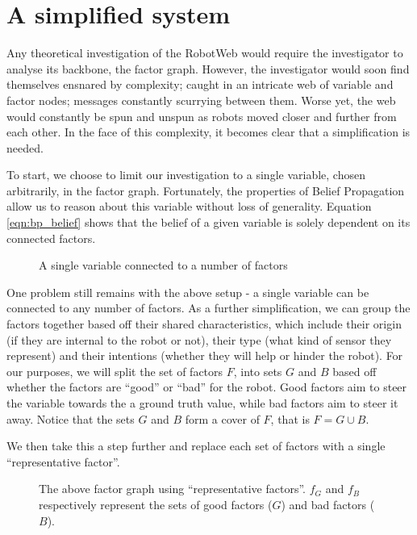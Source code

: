 \section{A simplified system}
Any theoretical investigation of the RobotWeb would require the investigator to analyse its backbone, the factor graph. However, the investigator would soon find themselves ensnared by complexity; caught in an intricate web of variable and factor nodes; messages constantly scurrying between them. Worse yet, the web would constantly be spun and unspun as robots moved closer and further from each other.
In the face of this complexity, it becomes clear that a simplification is needed.

To start, we choose to limit our investigation to a single variable, chosen arbitrarily, in the factor graph. Fortunately, the properties of Belief Propagation allow us to reason about this variable without loss of generality. Equation \ref{eqn:bp_belief} shows that the belief of a given variable is solely dependent on its connected factors. 

\begin{figure}[!h]
	\centering
	

	\caption[Single Variable in a Factor Graph]{A single variable connected to a number of factors}
\end{figure}

One problem still remains with the above setup - a single variable can be connected to any number of factors. As a further simplification, we can group the factors together based off their shared characteristics, which include their origin (if they are internal to the robot or not), their type (what kind of sensor they represent) and their intentions (whether they will help or hinder the robot). For our purposes, we will split the set of factors $F$, into sets $G$ and $B$ based off whether the factors are ``good'' or ``bad'' for the robot. Good factors aim to steer the variable towards the a ground truth value, while bad factors aim to steer it away. Notice that the sets $G$ and $B$ form a cover of $F$, that is $F = G \cup B$.

We then take this a step further and replace each set of factors with a single ``representative factor''.
\begin{figure}[!ht]
	\centering
	

	\caption[Representative factor graph around a single variable]{The above factor graph using ``representative factors''. $f_G$ and $f_B$ respectively represent the sets of good factors ($G$) and bad factors ($B$).}
\end{figure}

